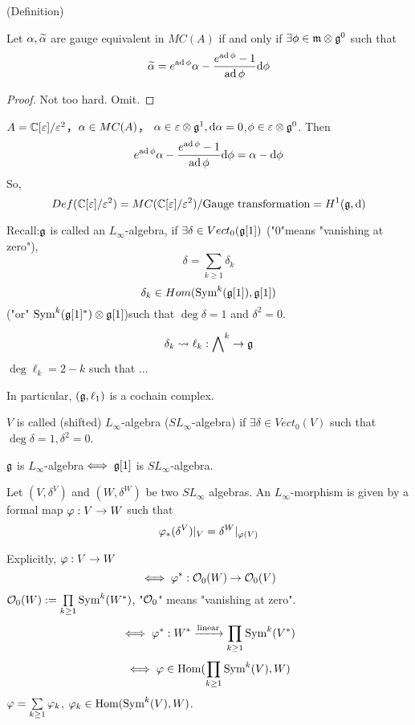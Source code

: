 \begin{prop}(Definition)

Let $\alpha,\widetilde{\alpha}$ are gauge equivalent in $MC(A)$ if and only if
$\exists\phi\in\mathfrak{m}\otimes\mathfrak{g}^0$ such that
$$\widetilde{\alpha}=e^{\operatorname{ad}\phi}\alpha-\frac{e^{\operatorname{ad}\phi}-1}{\operatorname{ad}\phi}\mathrm{d}\phi$$
\end{prop}

\begin{proof}
Not too hard. Omit.
\end{proof}

\begin{example}$A=\mathbb{C}[\varepsilon]/\varepsilon^2$，$\alpha\in MC(A)$，
$\alpha\in\varepsilon\otimes \mathfrak{g}^1,\mathrm{d}\alpha=0$,$\phi\in\varepsilon\otimes\mathfrak{g}^0$. Then
$$e^{\operatorname{ad}\phi}\alpha-\frac{e^{\operatorname{ad}\phi}-1}{\operatorname{ad}\phi}\mathrm{d}\phi
=\alpha-\mathrm{d}\phi$$
So,
$$
  Def(\mathbb{C}[\varepsilon]/\varepsilon^2)
=MC(\mathbb{C}[\varepsilon]/\varepsilon^2)/\text{Gauge transformation}
=H^1(\mathfrak{g},\mathrm{d})
$$
\end{example}

Recall:$\mathfrak{g}$ is called an $L_\infty$-algebra,
if $\exists\delta\in Vect_0(\mathfrak{g}[1])$
("$0$"means "vanishing at zero"),
$$\delta=\sum_{k\geq 1}\delta_k$$
$$\delta_k\in Hom(\operatorname{Sym}^k(\mathfrak{g}[1]),\mathfrak{g}[1])$$
("or" $\operatorname{Sym}^k(\mathfrak{g}[1]^*)\otimes\mathfrak{g}[1]$)such that
$\deg\delta=1$ and $\delta^2=0$.

$$\delta_k\rightsquigarrow
\ell_k:\bigwedge\nolimits^{k}\to\mathfrak{g}$$
$\deg\ell_k=2-k$ such that ...

In particular, $(\mathfrak{g},\ell_1)$ is a cochain complex.

\begin{definition}
$V$ is called (shifted) $L_\infty$-algebra
($SL_\infty$-algebra) if $\exists \delta\in Vect_0(V)$
such that $\deg\delta=1,\delta^2=0$.

$\mathfrak{g}$ is $L_\infty$-algebra$\iff\mathfrak{g}[1]$ is $SL_{\infty}$-algebra.
\end{definition}

\begin{definition}
Let $(V,\delta^V)$ and $(W,\delta^W)$ be two $SL_\infty$ algebras.
An $L_\infty$-morphism is given by a formal map
$\varphi: V\to W$ such that
$$\varphi_*(\delta^V)|_V=\delta^W|_{\varphi(V)}$$
\end{definition}

Explicitly, $\varphi:V\to W$
$$\iff \varphi^*:\mathcal{O}_0(W)\to\mathcal{O}_0(V)$$
$\mathcal{O}_0(W):=\prod\limits_{k\geq 1}\operatorname{Sym}^k(W^*)$,
"$\mathcal{O}_0$" means "vanishing at zero".
$$\iff\varphi^*: W^*\xrightarrow{\text{linear}}\prod_{k\geq 1}\operatorname{Sym}^k(V^*)$$
$$\iff\varphi\in \operatorname{Hom}(\prod_{k\geq 1}\operatorname{Sym}^k(V),W)$$
$\varphi=\sum\limits_{k\geq 1}\varphi_k$,
$\varphi_k\in\operatorname{Hom}(\operatorname{Sym}^k(V),W)$.

